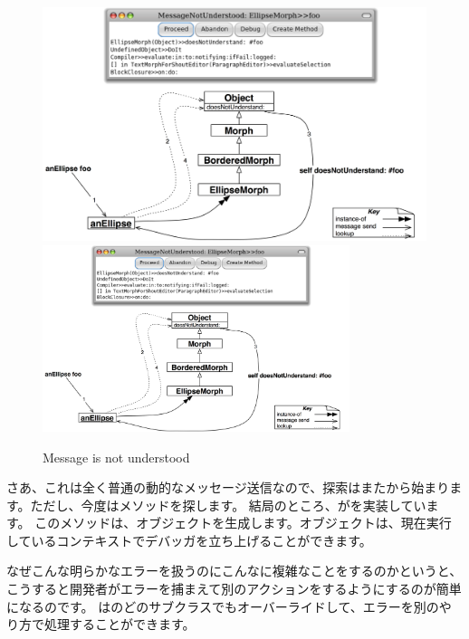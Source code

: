 \documentclass[a4paper,10pt,twoside]{book}
\begin{document}
\begin{figure}[htb]
\begin{center}
\ifluluelse
	{\includegraphics[width=\textwidth]{fooNotFound}}
	{\includegraphics[width=0.8\textwidth]{fooNotFound}}
\caption{Message  is not understood}
\end{center}
\end{figure}

さあ、これは全く普通の動的なメッセージ送信なので、探索はまたから始まります。ただし、今度はメソッドを探します。
結局のところ、がを実装しています。
このメソッドは、オブジェクトを生成します。オブジェクトは、現在実行しているコンテキストでデバッガを立ち上げることができます。

なぜこんな明らかなエラーを扱うのにこんなに複雑なことをするのかというと、
こうすると開発者がエラーを捕まえて別のアクションをするようにするのが簡単になるのです。
はのどのサブクラスでもオーバーライドして、エラーを別のやり方で処理することができます。
\end{document}
